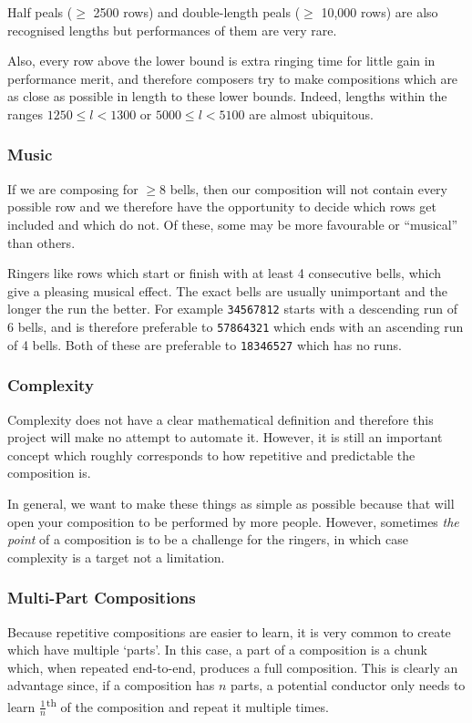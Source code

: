 \documentclass[12pt]{article}
\newcommand{\row}[1]{\texttt{#1}}
\newcommand{\nth}[2]{#1\textsuperscript{#2}}
\begin{document}
Half peals ($\ge$ 2500 rows) and double-length peals ($\ge$ 10,000 rows) are also recognised lengths
but performances of them are very rare.

Also, every row above the lower bound is extra ringing time for little gain in performance merit,
and therefore composers try to make compositions which are as close as possible in length to these
lower bounds.  Indeed, lengths within the ranges $1250 \le l < 1300$ or $5000 \le l < 5100$ are
almost ubiquitous.

\subsubsection{Music}

If we are composing for $\ge 8$ bells, then our composition will not contain every possible row and
we therefore have the opportunity to decide which rows get included and which do not.  Of these, some
may be more favourable or ``musical'' than others.

Ringers like rows which start or finish with at least 4 consecutive bells, which give a pleasing
musical effect.  The exact bells are usually unimportant and the longer the run the better.  For
example \row{34567812} starts with a descending run of 6 bells, and is therefore preferable to
\row{57864321} which ends with an ascending run of 4 bells.  Both of these are preferable to
\row{18346527} which has no runs.

\subsubsection{Complexity}

Complexity does not have a clear mathematical definition and therefore this project will make no
attempt to automate it.  However, it is still an important concept which roughly corresponds to how
repetitive and predictable the composition is.

In general, we want to make these things as simple as possible because that will open your
composition to be performed by more people.  However, sometimes \emph{the point} of a composition is
to be a challenge for the ringers, in which case complexity is a target not a limitation.

\subsubsection{Multi-Part Compositions}

Because repetitive compositions are easier to learn, it is very common to create which have multiple
`parts'.  In this case, a part of a composition is a chunk which, when repeated end-to-end, produces
a full composition.  This is clearly an advantage since, if a composition has $n$ parts, a potential
conductor only needs to learn \nth{$\frac{1}{n}$}{th} of the composition and repeat it multiple
times.
\end{document}
